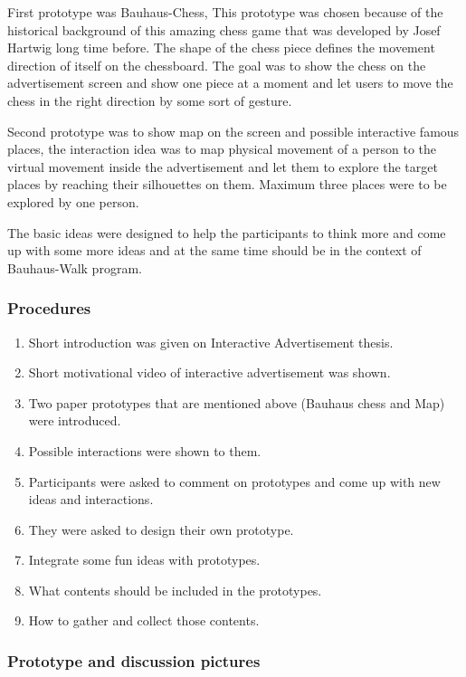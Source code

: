 First prototype was Bauhaus-Chess, This prototype was chosen because of the historical background of this amazing chess game that was developed by Josef Hartwig \cite{Josef} long time before. The shape of the chess piece defines the movement direction of itself on the chessboard. The goal was to show the chess on the advertisement screen and show one piece at a moment and let users to move the chess in the right direction by some sort of gesture. 

Second prototype was to show map on the screen and possible interactive famous places, the interaction idea was to map physical movement of a person to the virtual movement inside the advertisement and let them to explore the target places by reaching their silhouettes on them. Maximum three places were to be explored by one person.

The basic ideas were designed to help the participants to think more and come up with some more ideas and at the same time should be in the context of Bauhaus-Walk program. 

\subsubsection{Procedures}
\begin{enumerate}
\item   Short introduction was given on Interactive Advertisement thesis.
\item	Short motivational video of interactive advertisement was shown.
\item	Two paper prototypes that are mentioned above (Bauhaus chess and Map) were introduced.
\item	Possible interactions were shown to them.
\item	Participants were asked to comment on prototypes and come up with new ideas and interactions.
\item	They were asked to design their own prototype.
\item	Integrate some fun ideas with prototypes.
\item	What contents should be included in the prototypes.
\item	How to gather and collect those contents.
\end{enumerate}

\subsubsection{Prototype and discussion pictures}



